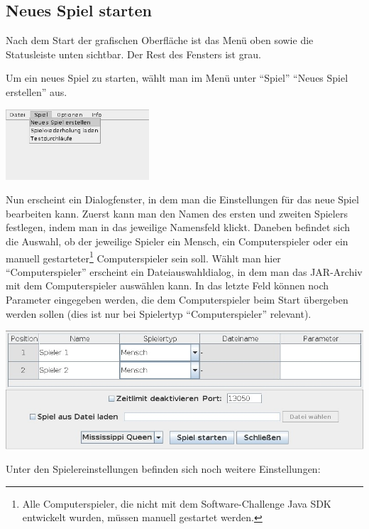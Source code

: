 \documentclass[12pt,a4paper, ngerman, oneside]{scrartcl}
\begin{document}
\subsection{Neues Spiel starten}

Nach dem Start der grafischen Oberfläche ist das Menü oben sowie die Statusleiste unten sichtbar. Der Rest des Fensters ist grau.

Um ein neues Spiel zu starten, wählt man im Menü unter ``Spiel'' ``Neues Spiel
erstellen'' aus.

{%
\centering%
\includegraphics[width=0.4\textwidth]{bilder/neues-spiel-menu.jpg}
}

Nun erscheint ein Dialogfenster, in dem man die Einstellungen für das neue Spiel
bearbeiten kann. Zuerst kann man den Namen des ersten und zweiten Spielers
festlegen, indem man in das jeweilige Namensfeld klickt. Daneben befindet sich
die Auswahl, ob der jeweilige Spieler ein Mensch, ein Computerspieler oder ein
manuell gestarteter\footnote{Alle Computerspieler, die nicht mit dem
  Software-Challenge Java SDK entwickelt wurden, müssen manuell gestartet
  werden.} Computerspieler sein soll. Wählt man hier ``Computerspieler''
erscheint ein Dateiauswahldialog, in dem man das JAR-Archiv mit dem
Computerspieler auswählen kann. In das letzte Feld können noch Parameter
eingegeben werden, die dem Computerspieler beim Start übergeben werden sollen
(dies ist nur bei Spielertyp ``Computerspieler'' relevant).

\begin{centering}
  \includegraphics[width=\textwidth]{bilder/neues-spiel-dialog.jpg}
\end{centering}

Unter den Spielereinstellungen befinden sich noch weitere Einstellungen:
\end{document}
